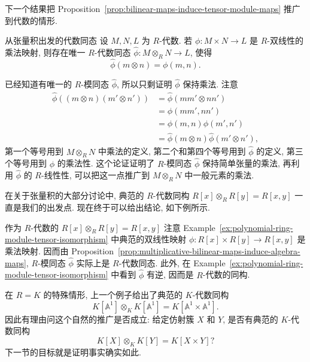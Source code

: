 下一个结果把 Proposition~\ref{prop:bilinear-maps-induce-tensor-module-maps} 推广到代数的情形.

\begin{Proposition}{从张量积出发的代数同态}\leavevmode\label{prop:multiplicative-bilinear-maps-induce-algebra-maps}
设 $M,N,L$ 为 $R$-代数. 若 $\phi:M\times N\to L$ 是 $R$-双线性的乘法映射, 则存在唯一 $R$-代数同态 $\widehat{\phi}:M\otimes_{R}N\to L$, 使得
\[
  \widehat{\phi}(m\otimes n)=\phi(m,n).
\]
\end{Proposition}
\begin{Proof}
已经知道有唯一的 $R$-模同态 $\widehat{\phi}$, 所以只剩证明 $\widehat{\phi}$ 保持乘法. 注意
\[
  \begin{aligned}
    \widehat{\phi}((m\otimes n)(m'\otimes n'))
      &=\widehat{\phi}(mm'\otimes nn')\\
      &=\phi(mm',nn')\\
      &=\phi(m,n)\phi(m',n')\\
      &=\widehat{\phi}(m\otimes n)\widehat{\phi}(m'\otimes n'),
  \end{aligned}
\]
第一个等号用到 $M\otimes_{R}N$ 中乘法的定义, 第二个和第四个等号用到 $\widehat{\phi}$ 的定义, 第三个等号用到 $\phi$ 的乘法性. 这个论证证明了 $R$-模同态 $\widehat{\phi}$ 保持简单张量的乘法, 再利用 $\widehat{\phi}$ 的 $R$-线性性, 可以把这一点推广到 $M\otimes_{R}N$ 中一般元素的乘法.
\end{Proof}

在关于张量积的大部分讨论中, 典范的 $R$-代数同构 $R[x]\otimes_{R}R[y]=R[x,y]$ 一直是我们的出发点. 现在终于可以给出结论, 如下例所示.

\begin{Example}{{作为 $R$-代数的 \textmd{$R[x]\otimes_{R}R[y]=R[x,y]$}}}\leavevmode\label{ex:polynomial-ring-algebra-tensor-isomorphism}
注意 Example~\ref{ex:polynomial-ring-module-tensor-isomorphism} 中典范的双线性映射 $\phi:R[x]\times R[y]\to R[x,y]$ 是乘法映射. 因而由 Proposition~\ref{prop:multiplicative-bilinear-maps-induce-algebra-maps}, $R$-模同态 $\widehat{\phi}$ 实际上是 $R$-代数同态. 此外, 在 Example~\ref{ex:polynomial-ring-module-tensor-isomorphism} 中看到 $\widehat{\phi}$ 有逆, 因而是 $R$-代数的同构.
\end{Example}

在 $R=K$ 的特殊情形, 上一个例子给出了典范的 $K$-代数同构
\[
  K[\mathbb{A}^{1}]\otimes_{K}K[\mathbb{A}^{1}]=K[\mathbb{A}^{1}\times\mathbb{A}^{1}].
\]
因此有理由问这个自然的推广是否成立: 给定仿射簇 $X$ 和 $Y$, 是否有典范的 $K$-代数同构
\[
  K[X]\otimes_{K}K[Y]=K[X\times Y]?
\]
下一节的目标就是证明事实确实如此.

